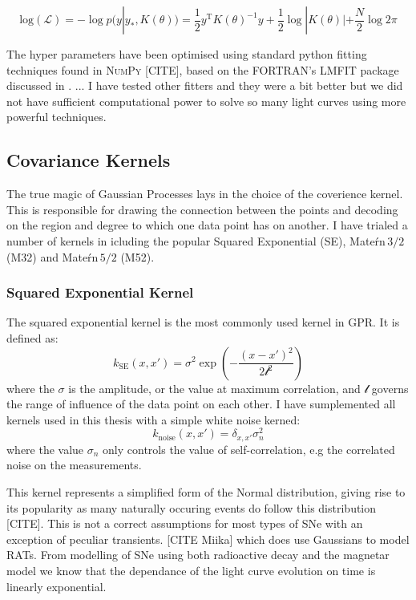 \begin{equation} \label{eg:logGP}
\mathrm{log(\mathcal{L})} = - \log p(y|y_*, K(\theta)) = \frac{1}{2} y^{\mathrm{T}} K(\theta)^{-1} y + \frac{1}{2} \log |K(\theta)| + \frac{N}{2} \log 2 \pi
\end{equation}

The hyper parameters have been optimised using standard python fitting techniques found in \textsc{NumPy} [CITE], based on the \textsc{FORTRAN}'s \textsc{LMFIT} package discussed in . ... I have tested other fitters and they were a bit better but we did not have sufficient computational power to solve so many light curves using more powerful techniques.

\subsection{Covariance Kernels}
The true magic of Gaussian Processes lays in the choice of the coverience kernel. This is responsible for drawing the connection between the points and decoding on the region and degree to which one data point has on another. I have trialed a number of kernels in icluding the popular Squared Exponential (SE), Mate\'rn\,$3/2$ (M32) and Mate\'rn\,$5/2$ (M52).

\subsubsection{Squared Exponential Kernel}
The squared exponential kernel is the most commonly used kernel in GPR. It is defined as:
\begin{equation}
  k_{\textrm{SE}}(x,x') = \sigma^2 \exp\left(-\frac{(x - x')^2}{2\mathcal{l}^2}\right)
\end{equation}
\noindent where the $\sigma$ is the amplitude, or the value at maximum correlation, and $\mathcal{l}$ governs the range of influence of the data point on each other. I have sumplemented all kernels used in this thesis with a simple white noise kerned:
\begin{equation}
  k_{\textrm{noise}}(x,x') = \delta_{x,x'}\sigma_n^2
\end{equation}
\noindent where the value $\sigma_n$ only controls the value of self-correlation, e.g the correlated noise on the measurements.

This kernel represents a simplified form of the Normal distribution, giving rise to its popularity as many naturally occuring events do follow this distribution [CITE]. This is not a correct assumptions for most types of SNe with an exception of peculiar transients. [CITE Miika] which does use Gaussians to model RATs. From modelling of SNe using both radioactive decay and the magnetar model we know that the dependance of the light curve evolution on time is linearly exponential.

